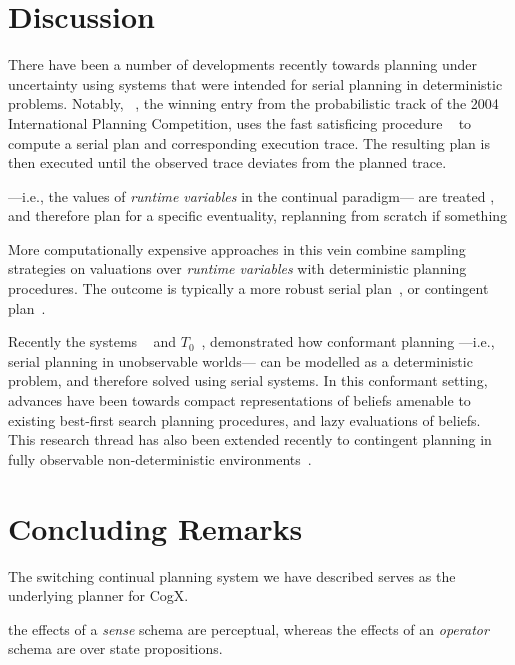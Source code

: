 \documentclass[letterpaper]{article}
\begin{document}
\section{Discussion}

There have been a number of developments recently towards planning
under uncertainty using systems that were intended for serial planning
in deterministic problems.  Notably,
~\cite{yoon:etal:2007}, the winning entry from the
probabilistic track of the 2004 International Planning Competition,
uses the fast satisficing procedure
~\cite{hoffmann:nebel:2001} to compute a serial plan and
corresponding execution trace. The resulting plan is then executed
until the observed trace deviates from the planned trace.

 ---i.e., the values of {\em
runtime variables} in the continual paradigm--- are treated , and
therefore plan for a specific eventuality, replanning from scratch if
something


More computationally expensive approaches in this vein combine
sampling strategies on valuations over {\em runtime variables} with
deterministic planning procedures. The outcome is typically a more
robust serial plan~\cite{yoon:etal:2008}, or contingent
plan~\cite{majercik:2006}.



Recently the systems
~\cite{hoffmann:brafman:2006} and
$T_0$~\cite{palacios:geffner:2009}, demonstrated how conformant
planning ---i.e., serial planning in unobservable worlds--- can be
modelled as a deterministic problem, and therefore solved using serial
systems. In this conformant setting, advances have been towards
compact representations of beliefs amenable to existing best-first
search planning procedures, and lazy evaluations of beliefs. This
research thread has also been extended recently to contingent planning
in fully observable non-deterministic
environments~\cite{albore:etal:2009}.

\section{Concluding Remarks}

The switching continual planning system we have described serves as
the underlying planner for CogX.




the effects of a {\em sense} schema are perceptual, whereas the
effects of an {\em operator} schema are over state propositions.
\end{document}
